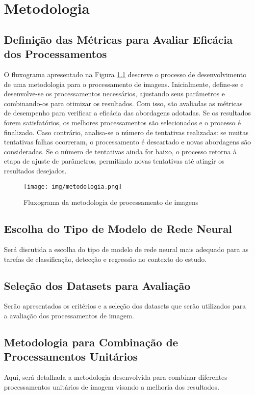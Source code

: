 \chapter{Metodologia}
\section{Definição das Métricas para Avaliar Eficácia dos Processamentos}

O fluxograma apresentado na Figura \ref{fig:fluxograma_metodologia} descreve o processo de desenvolvimento de uma metodologia para o processamento de imagens. Inicialmente, define-se e desenvolve-se os processamentos necessários, ajustando seus parâmetros e combinando-os para otimizar os resultados. Com isso, são avaliadas as métricas de desempenho para verificar a eficácia das abordagens adotadas. Se os resultados forem satisfatórios, os melhores processamentos são selecionados e o processo é finalizado. Caso contrário, analisa-se o número de tentativas realizadas: se muitas tentativas falhas ocorreram, o processamento é descartado e novas abordagens são consideradas. Se o número de tentativas ainda for baixo, o processo retorna à etapa de ajuste de parâmetros, permitindo novas tentativas até atingir os resultados desejados.

\begin{figure}[H]
    \centering
    \texttt{[image: img/metodologia.png]}
    \caption{Fluxograma da metodologia de processamento de imagens}
    \label{fig:fluxograma_metodologia}
\end{figure}

\section{Escolha do Tipo de Modelo de Rede Neural}
Será discutida a escolha do tipo de modelo de rede neural mais adequado para as tarefas de classificação, detecção e regressão no contexto do estudo.

\section{Seleção dos Datasets para Avaliação}
Serão apresentados os critérios e a seleção dos datasets que serão utilizados para a avaliação dos processamentos de imagem.

\section{Metodologia para Combinação de Processamentos Unitários}
Aqui, será detalhada a metodologia desenvolvida para combinar diferentes processamentos unitários de imagem visando a melhoria dos resultados.

